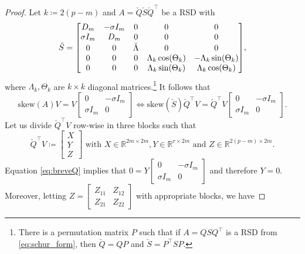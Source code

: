 \documentclass[10pt,twoside,dvipsnames]{siamart1116}
\numberwithin{algorithm}{section}
\numberwithin{equation}{section}
\begin{document}
	\begin{proof}
	 Let $k\coloneq 2(p-m)$ and $A=\breve{Q}\breve{S}\breve{Q}^\top $ be a RSD with
	 \begin{equation}\label{eq:permuted_Schur}
	 \breve{S} = {\scriptsize \begin{bmatrix}
	 D_m&-\sigma I_m&0&0&0\\
	 \sigma I_m&D_m& 0&0&0\\
	 0&0&\breve{\Lambda}&0&0\\
	 0&0&0&\Lambda_k\cos(\Theta_k)&-\Lambda_k\sin(\Theta_k)\\
	 0&0&0&\Lambda_k\sin(\Theta_k)&\Lambda_k\cos(\Theta_k)\\
	 \end{bmatrix}},
\end{equation}
where $\Lambda_k,\Theta_k$ are $k\times k$ diagonal matrices.\footnote{There is a permutation matrix $P$ such that if $A=QSQ^\top$ is a RSD from \eqref{eq:schur_form}, then $\breve{Q} = QP$ and $\breve{S} = P^\top S P$.} It follows that 
	 \begin{equation}
	 \label{eq:breveQ}
	 \mathrm{skew}(A)V = V\begin{bmatrix}
	0&-\sigma I_m\\
	\sigma I_m&0
	\end{bmatrix}\iff \mathrm{skew}(\breve{S})\breve{Q}^\top V = \breve{Q}^\top V \begin{bmatrix}
	0&-\sigma I_m\\
	\sigma I_m&0
	\end{bmatrix}.
	 \end{equation}
	 Let us divide $\breve{Q}^\top V$ row-wise in three blocks such that \begin{equation*}
	 \breve{Q}^\top V \coloneq \begin{bmatrix}
	 X\\
	 Y\\
	Z
	 \end{bmatrix}\text{ with } X\in\mathbb{R}^{2m\times 2m}, Y\in\mathbb{R}^{r\times 2m}\text{ and }Z \in\mathbb{R}^{2(p-m)\times 2m}.
	 \end{equation*}
	 Equation \eqref{eq:breveQ} implies that $0=Y\left[\begin{smallmatrix}0&-\sigma I_m\\ \sigma I_m &0\end{smallmatrix}\right]$ and therefore $Y=0$. Moreover, letting $Z = \left[\begin{smallmatrix}Z_{11}&Z_{12}\\ Z_{21}&Z_{22}\end{smallmatrix}\right]$ with appropriate blocks, we have

\end{proof}
\end{document}
